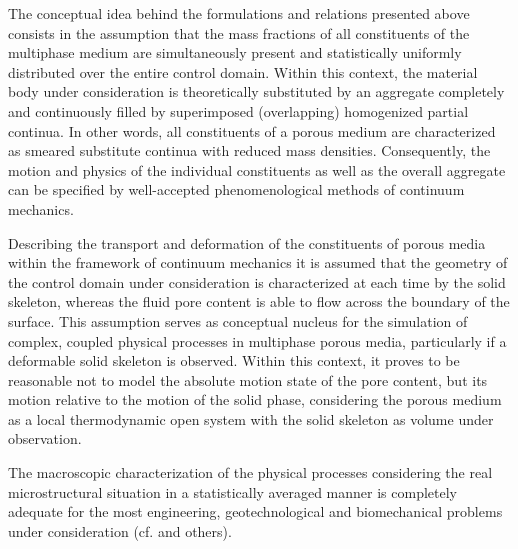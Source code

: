 The conceptual idea behind the formulations and relations presented above consists in the assumption that the mass fractions of all constituents of the multiphase medium are simultaneously present and statistically uniformly distributed over the entire control domain. Within this context, the material body under consideration is theoretically substituted by an aggregate completely and continuously filled by superimposed (overlapping) homogenized partial continua. In other words, all constituents of a porous medium are characterized as smeared substitute continua with reduced mass densities. Consequently, the motion and physics of the individual constituents as well as the overall aggregate can be specified by well-accepted phenomenological methods of continuum mechanics.

Describing the transport and deformation of the constituents of porous media within the framework of continuum mechanics it is assumed that the geometry of the control domain under consideration is characterized at each time by the solid skeleton, whereas the fluid pore content is able to flow across the boundary of the surface. This assumption serves as conceptual nucleus for the simulation of complex, coupled physical processes in multiphase porous media, particularly if a deformable solid skeleton is observed. Within this context, it proves to be reasonable not to model the absolute motion state of the pore content, but its motion relative to the motion of the solid phase, considering the porous medium as a local thermodynamic open system with the solid skeleton as volume under observation.

The macroscopic characterization of the physical processes considering the real microstructural situation in a statistically averaged manner is completely adequate for the most engineering, geotechnological and biomechanical problems under consideration (cf. \cite{GWASG:2006} and others).